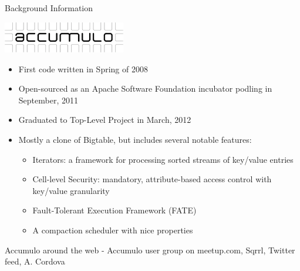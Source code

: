 \documentclass[t,landscape]{beamer}
\begin{document}
\begin{frame}{Background Information}
\begin{center}
\includegraphics[width=0.4\textwidth]{images/accumulo-logo.png}
\end{center}
\scriptsize
\begin{itemize}
\item{First code written in Spring of 2008}
\item{Open-sourced as an Apache Software Foundation incubator podling in September, 2011}
\item{Graduated to Top-Level Project in March, 2012}
\item{Mostly a clone of Bigtable, but includes several notable features:
	\begin{itemize}
		\scriptsize
		\item{Iterators: a framework for processing sorted streams of key/value entries}
		\item{Cell-level Security: mandatory, attribute-based access control with key/value granularity}
		\item{Fault-Tolerant Execution Framework (FATE)}
		\item{A compaction scheduler with nice properties}
	\end{itemize}
}
\end{itemize}
\end{frame}

\begin{frame}{Accumulo around the web}
- Accumulo user group on meetup.com, Sqrrl, Twitter feed, A. Cordova
\end{frame}
\end{document}
